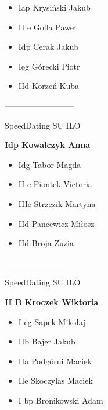 \documentclass[a4paper,10pt]{article}
\begin{document}
\begin{multicols}{3}
\begin{minipage}[l]{\textwidth}
  \begin{itemize}
    \item Iap Krysiński Jakub
    \item II e Golla Paweł
    \item Idp Cerak Jakub
    \item Ieg Górecki Piotr
    \item IId Korzeń Kuba

    \end{itemize}



\end{minipage}



\begin{minipage}[l]{\textwidth}
--------------------------

  \footnotesize{SpeedDating SU ILO}

  \bfseries{Idp Kowalczyk Anna}

  \begin{itemize}
    \item Idg Tabor Magda
    \item II c Piontek Victoria
    \item IIIe Strzezik Martyna
    \item IId Pancewicz Miłosz
    \item IId Broja Zuzia

    \end{itemize}



\end{minipage}



\begin{minipage}[l]{\textwidth}
--------------------------

  \footnotesize{SpeedDating SU ILO}

  \bfseries{II B Kroczek Wiktoria}

  \begin{itemize}
    \item I cg Sapek Mikołaj
    \item IIb Bajer Jakub
    \item IIa Podgórni Maciek
    \item IIe Skoczylas Maciek
    \item I bp Bronikowski Adam

    \end{itemize}




\end{minipage}
\end{multicols}
\end{document}
